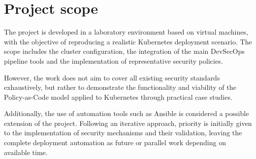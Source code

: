 \section{Project scope}

The project is developed in a laboratory environment based on virtual machines, with the objective of reproducing a realistic Kubernetes deployment scenario. The scope includes the cluster configuration, the integration of the main DevSecOps pipeline tools and the implementation of representative security policies.

However, the work does not aim to cover all existing security standards exhaustively, but rather to demonstrate the functionality and viability of the Policy-as-Code model applied to Kubernetes through practical case studies.

Additionally, the use of automation tools such as Ansible is considered a possible extension of the project. Following an iterative approach, priority is initially given to the implementation of security mechanisms and their validation, leaving the complete deployment automation as future or parallel work depending on available time.
